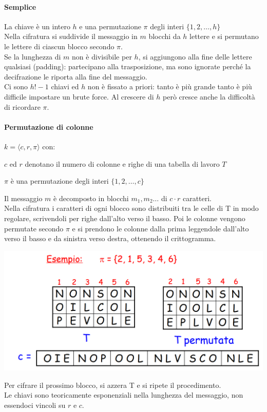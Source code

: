 \documentclass[10pt]{book}
\begin{document}
\paragraph{Semplice} La chiave è un intero $h$ e una permutazione $\pi$ degli interi $\{1,2,\ldots,h\}$\\
Nella cifratura si suddivide il messaggio in $m$ blocchi da $h$ lettere e si permutano le lettere di ciascun blocco secondo $\pi$.\\
Se la lunghezza di $m$ non è divisibile per $h$, si aggiungono alla fine delle lettere qualsiasi (padding): partecipano alla trasposizione, ma sono ignorate perché la decifrazione le riporta alla fine del messaggio.\\
Ci sono $h! -1$ chiavi ed $h$ non è fissato a priori: tanto è più grande tanto è più difficile impostare un brute force. Al crescere di $h$ però cresce anche la difficoltà di ricordare $\pi$.
\paragraph{Permutazione di colonne} $k=\langle c,r,\pi\rangle$ con:\begin{list}{}{}
	\item $c$ ed $r$ denotano il numero di colonne e righe di una tabella di lavoro $T$
	\item $\pi$ è una permutazione degli interi $\{1,2,\ldots,c\}$
\end{list}
Il messaggio $m$ è decomposto in blocchi $m_1,m_2\ldots$ di $c\cdot r$ caratteri.\\
Nella cifratura i caratteri di ogni blocco sono distribuiti tra le celle di T in modo regolare, scrivendoli per righe dall'alto verso il basso. Poi le colonne vengono permutate secondo $\pi$ e si prendono le colonne dalla prima leggendole dall'alto verso il basso e da sinistra verso destra, ottenendo il crittogramma.
\begin{center}
	\includegraphics[scale=0.4]{7.png}
\end{center}
Per cifrare il prossimo blocco, si azzera T e si ripete il procedimento.\\
Le chiavi sono teoricamente esponenziali nella lunghezza del messaggio, non essendoci vincoli su $r$ e $c$.
\end{document}
